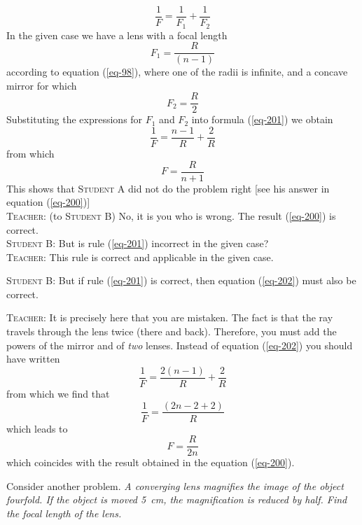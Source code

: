\documentclass[a4paper,sfsidenotes]{tufte-book}
\begin{document}
\begin{equation}
\frac{1}{F} = \frac{1}{F_{1}}+\frac{1}{F_{2}} 
\label{eq-201}
\end{equation}
In the given case we have a lens with a focal length 
\begin{equation*}
F_{1} = \frac{R}{ (n-1)}
\end{equation*}
according to equation (\ref{eq-98}), where one of the radii is infinite, and a concave mirror for which 
\begin{equation}
F_{2} = \frac{R}{2}
\end{equation}
Substituting the expressions for $F_{1}$ and $F_{2}$ into formula (\ref{eq-201}) we obtain
\begin{equation}
\frac{1}{F} = \frac{n-1}{R} + \frac{2}{R} 
\label{eq-202}
\end{equation}
from which 
\begin{equation}
F = \frac{R}{n+1}
\label{eq-203}
\end{equation}
This shows that \textsc{Student A} did not do the problem right [see his answer in equation (\ref{eq-200})]
\\
\textsc{Teacher:} (to \textsc{Student B}) No, it is you who is wrong. The result (\ref{eq-200}) is correct.
\\
\textsc{Student B:} But is rule (\ref{eq-201}) incorrect in the given case?
\\
\textsc{Teacher:} This rule is correct and applicable in the given case.

\textsc{Student B:} But if rule (\ref{eq-201}) is correct, then equation (\ref{eq-202}) must also be correct.

\textsc{Teacher:} It is precisely here that you are mistaken. The fact is that the ray travels through the lens twice (there and back). Therefore, you must add the powers of the mirror and of \emph{two} lenses. Instead of equation (\ref{eq-202}) you should have written
\begin{equation*}
\frac{1}{F} = \frac{2(n-1)}{R} + \frac{2}{R}
\end{equation*}
from which we find that 
\begin{equation*}
\frac{1}{F} = \frac{(2n-2+2)}{R} 
\end{equation*}
which leads to
\begin{equation*}
F = \frac{R}{2n}
\end{equation*}
which coincides with the result obtained in the equation (\ref{eq-200}).

Consider another problem. \emph{A converging lens magnifies the image of the object fourfold. If the object is moved \SI{5}{\centi\meter}, the magnification is reduced by half. Find the focal length of the lens.}
\end{document}

